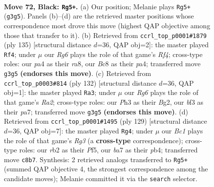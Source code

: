 \documentclass[11pt]{article}
\begin{document}
\clearpage

\begin{figure}[p]\centering
\begin{subfigure}{0.46\textwidth}\centering
\resizebox{\linewidth}{!}{%
\newchessgame
\chessboard[
  setfen={2b5/B4k2/8/K7/PP6/5Brp/1R5N/8 b - - 2 72},
  showmover=false,
  pgfstyle=straightmove, color=movearrow, markmove={g3-g5}
]}
\caption{}
\end{subfigure}\hfill
\begin{subfigure}{0.46\textwidth}\centering
\resizebox{\linewidth}{!}{%
\newchessgame
\chessboard[
  setfen={R7/4k3/1b6/4pr2/P7/5P2/4B3/4K3 b - - 1 68},
  showmover=false,
  pgfstyle=straightmove, color=movearrow, markmove={f5-f4}
]}
\caption{}
\end{subfigure}
\\[4pt]
\begin{subfigure}{0.46\textwidth}\centering
\resizebox{\linewidth}{!}{%
\newchessgame
\chessboard[
  setfen={3k4/p3r2p/2P5/3K3P/8/6b1/R5B1/8 w - - 15 67},
  showmover=false,
  pgfstyle=straightmove, color=movearrow, markmove={a2-a3}
]}
\caption{}
\end{subfigure}\hfill
\begin{subfigure}{0.46\textwidth}\centering
\resizebox{\linewidth}{!}{%
\newchessgame
\chessboard[
  setfen={8/2k5/4p1r1/5p2/1P6/P6R/1b3PB1/5K2 b - - 4 65},
  showmover=false,
  pgfstyle=straightmove, color=movearrow, markmove={g6-g4}
]}
\caption{}
\end{subfigure}
\caption{\textbf{Move 72, Black: \texttt{Rg5+}.} (a) Our position; Melanie plays \texttt{Rg5+} (\texttt{g3g5}). Panels (b)--(d) are the retrieved master positions whose correspondence most drove this move (highest QAP objective among those that transfer to it). (b) Retrieved from \texttt{ccrl\_top\_p0001\#1879} (ply 135) [structural distance $d$=36, QAP obj=2]: the master played \texttt{Rf4}; under $\mu$ our \emph{Rg6} plays the role of that game's \emph{Rf4}; cross-type roles: our \emph{p}a4 as their \emph{r}a8, our \emph{B}c8 as their \emph{p}a4; transferred move \texttt{g3g5} \textbf{(endorses this move)}. (c) Retrieved from \texttt{ccrl\_top\_p0003\#814} (ply 132) [structural distance $d$=36, QAP obj=1]: the master played \texttt{Ra3}; under $\mu$ our \emph{Rg6} plays the role of that game's \emph{Ra2}; cross-type roles: our \emph{P}h3 as their \emph{B}g2, our \emph{b}f3 as their \emph{p}a7; transferred move \texttt{g3g5} \textbf{(endorses this move)}. (d) Retrieved from \texttt{ccrl\_top\_p0001\#1495} (ply 129) [structural distance $d$=36, QAP obj=7]: the master played \texttt{Rg4}; under $\mu$ our \emph{Bc1} plays the role of that game's \emph{Rg3} (a \textbf{cross-type} correspondence); cross-type roles: our \emph{r}b2 as their \emph{P}f5, our \emph{b}a7 as their \emph{p}b4; transferred move \texttt{c8b7}. Synthesis: 2 retrieved analogs transferred to \texttt{Rg5+} (summed QAP objective 4, the strongest correspondence among the candidate moves); Melanie committed it via the \texttt{search} selector.}
\label{fig:thought-m143}
\end{figure}
\end{document}
